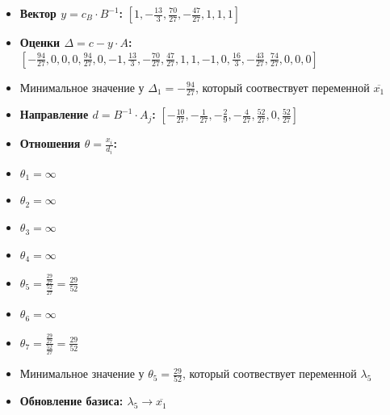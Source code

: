 \begin{itemize}
\begin{itemize}
$[1, 0, 0, 0, 1, 1, 1]$
\item \textbf{Вектор $y = c_B \cdot B^{-1}$:}
$[1, - \frac{13}{3}, \frac{70}{27}, - \frac{47}{27}, 1, 1, 1]$
\item \textbf{Оценки $\Delta = c - y \cdot A$:}
$[- \frac{94}{27}, 0, 0, 0, \frac{94}{27}, 0, -1, \frac{13}{3}, - \frac{70}{27}, \frac{47}{27}, 1, 1, -1, 0, \frac{16}{3}, - \frac{43}{27}, \frac{74}{27}, 0, 0, 0]$
\item Минимальное значение у  $\Delta_{1} = - \frac{94}{27}$, который соотвествует переменной $\overline{x_1}$
\item \textbf{Направление $d = B^{-1} \cdot A_j$:}
$[- \frac{10}{27}, - \frac{1}{27}, - \frac{2}{9}, - \frac{4}{27}, \frac{52}{27}, 0, \frac{52}{27}]$
\item \textbf{Отношения $\theta = \frac{x_i}{d_i}$:}
\item $\theta_{1} = \infty$
\item $\theta_{2} = \infty$
\item $\theta_{3} = \infty$
\item $\theta_{4} = \infty$
\item $\theta_{5} = \frac{\frac{29}{27}}{\frac{52}{27}} = \frac{29}{52}$
\item $\theta_{6} = \infty$
\item $\theta_{7} = \frac{\frac{29}{27}}{\frac{52}{27}} = \frac{29}{52}$
\item Минимальное значение у  $\theta_{5} = \frac{29}{52}$, который соотвествует переменной $\lambda_5$
\item \textbf{Обновление базиса: $\lambda_5 \rightarrow \overline{x_1}$}
\end{itemize}
\newpage

\end{itemize}
